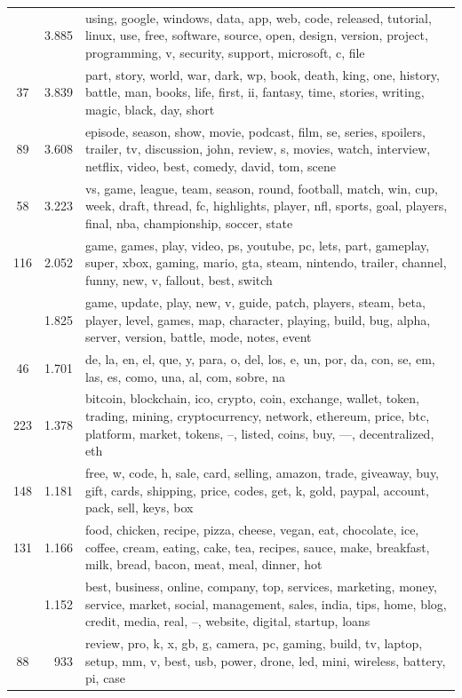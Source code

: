 \documentclass[11pt,a4paper,twoside]{article}
\begin{document}
\begin{longtable}[t]{cr >{\raggedright\arraybackslash}p{}}
\addlinespace
239 & 3.885 & using, google, windows, data, app, web, code, released, tutorial, linux, use, free, software, source, open, design, version, project, programming, v, security, support, microsoft, c, file\\
37 & 3.839 & part, story, world, war, dark, wp, book, death, king, one, history, battle, man, books, life, first, ii, fantasy, time, stories, writing, magic, black, day, short\\
89 & 3.608 & episode, season, show, movie, podcast, film, se, series, spoilers, trailer, tv, discussion, john, review, s, movies, watch, interview, netflix, video, best, comedy, david, tom, scene\\
58 & 3.223 & vs, game, league, team, season, round, football, match, win, cup, week, draft, thread, fc, highlights, player, nfl, sports, goal, players, final, nba, championship, soccer, state\\
116 & 2.052 & game, games, play, video, ps, youtube, pc, lets, part, gameplay, super, xbox, gaming, mario, gta, steam, nintendo, trailer, channel, funny, new, v, fallout, best, switch\\
\addlinespace
21 & 1.825 & game, update, play, new, v, guide, patch, players, steam, beta, player, level, games, map, character, playing, build, bug, alpha, server, version, battle, mode, notes, event\\
46 & 1.701 & de, la, en, el, que, y, para, o, del, los, e, un, por, da, con, se, em, las, es, como, una, al, com, sobre, na\\
223 & 1.378 & bitcoin, blockchain, ico, crypto, coin, exchange, wallet, token, trading, mining, cryptocurrency, network, ethereum, price, btc, platform, market, tokens, –, listed, coins, buy, —, decentralized, eth\\
148 & 1.181 & free, w, code, h, sale, card, selling, amazon, trade, giveaway, buy, gift, cards, shipping, price, codes, get, k, gold, paypal, account, pack, sell, keys, box\\
131 & 1.166 & food, chicken, recipe, pizza, cheese, vegan, eat, chocolate, ice, coffee, cream, eating, cake, tea, recipes, sauce, make, breakfast, milk, bread, bacon, meat, meal, dinner, hot\\
\addlinespace
117 & 1.152 & best, business, online, company, top, services, marketing, money, service, market, social, management, sales, india, tips, home, blog, credit, media, real, –, website, digital, startup, loans\\
88 & 933 & review, pro, k, x, gb, g, camera, pc, gaming, build, tv, laptop, setup, mm, v, best, usb, power, drone, led, mini, wireless, battery, pi, case\\

\end{longtable}
\end{document}
